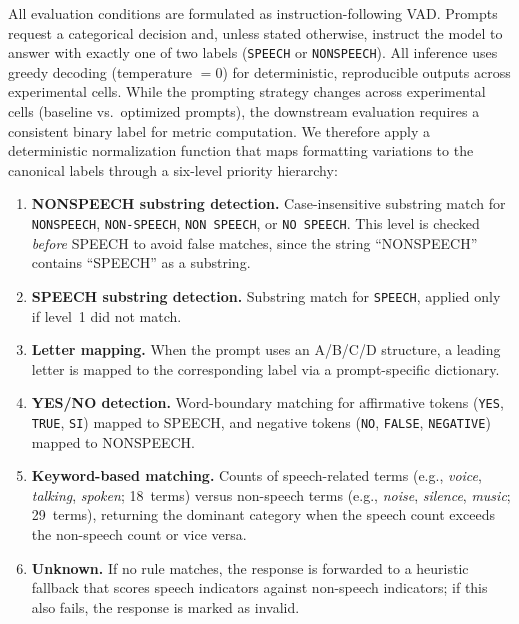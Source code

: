 \documentclass[11pt,a4paper]{article}
\begin{document}
All evaluation conditions are formulated as instruction-following VAD. Prompts request a categorical decision and, unless stated otherwise, instruct the model to answer with exactly one of two labels (\texttt{SPEECH} or \texttt{NONSPEECH}). All inference uses greedy decoding (temperature $= 0$) for deterministic, reproducible outputs across experimental cells. While the prompting strategy changes across experimental cells (baseline vs.\ optimized prompts), the downstream evaluation requires a consistent binary label for metric computation. We therefore apply a deterministic normalization function that maps formatting variations to the canonical labels through a six-level priority hierarchy:
\begin{enumerate}[leftmargin=*]
    \item \textbf{NONSPEECH substring detection.} Case-insensitive substring match for \texttt{NONSPEECH}, \texttt{NON-SPEECH}, \texttt{NON SPEECH}, or \texttt{NO SPEECH}. This level is checked \emph{before} SPEECH to avoid false matches, since the string ``NONSPEECH'' contains ``SPEECH'' as a substring.
    \item \textbf{SPEECH substring detection.} Substring match for \texttt{SPEECH}, applied only if level~1 did not match.
    \item \textbf{Letter mapping.} When the prompt uses an A/B/C/D structure, a leading letter is mapped to the corresponding label via a prompt-specific dictionary.
    \item \textbf{YES/NO detection.} Word-boundary matching for affirmative tokens (\texttt{YES}, \texttt{TRUE}, \texttt{SI}) mapped to SPEECH, and negative tokens (\texttt{NO}, \texttt{FALSE}, \texttt{NEGATIVE}) mapped to NONSPEECH.
    \item \textbf{Keyword-based matching.} Counts of speech-related terms (e.g., \textit{voice}, \textit{talking}, \textit{spoken}; 18~terms) versus non-speech terms (e.g., \textit{noise}, \textit{silence}, \textit{music}; 29~terms), returning the dominant category when the speech count exceeds the non-speech count or vice versa.
    \item \textbf{Unknown.} If no rule matches, the response is forwarded to a heuristic fallback that scores speech indicators against non-speech indicators; if this also fails, the response is marked as invalid.
\end{enumerate}
\end{document}
